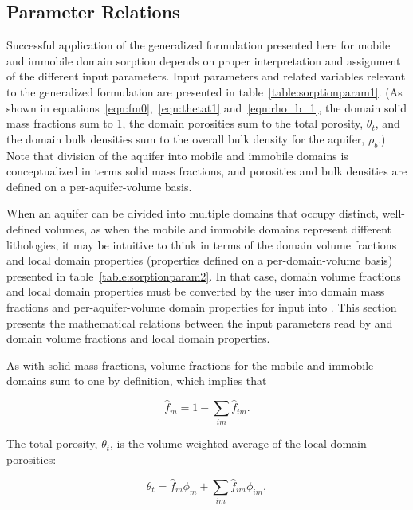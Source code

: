 \subsection{Parameter Relations} \label{sec:solidmassfrac3}

Successful application of the generalized formulation presented here for mobile and immobile domain sorption depends on proper interpretation and assignment of the different input parameters.  Input parameters and related variables relevant to the generalized formulation are presented in table~\ref{table:sorptionparam1}. (As shown in equations~\ref{eqn:fm0},~\ref{eqn:thetat1} and~\ref{eqn:rho_b_1}, the domain solid mass fractions sum to 1, the domain porosities sum to the total porosity, $\theta_t$, and the domain bulk densities sum to the overall bulk density for the aquifer, $\rho_b$.) Note that division of the aquifer into mobile and immobile domains is conceptualized in terms solid mass fractions, and porosities and bulk densities are defined on a per-aquifer-volume basis.  



When an aquifer can be divided into multiple domains that occupy distinct, well-defined volumes, as when the mobile and immobile domains represent different lithologies, it may be intuitive to think in terms of the domain volume fractions and local domain properties (properties defined on a per-domain-volume basis) presented in table~\ref{table:sorptionparam2}.  In that case, domain volume fractions and local domain properties must be converted by the user into domain mass fractions and per-aquifer-volume domain properties for input into \mf.  This section presents the mathematical relations between the input parameters read by \mf and domain volume fractions and local domain properties.



As with solid mass fractions, volume fractions for the mobile and immobile domains sum to one by definition, which implies that

\begin{equation}
\label{eqn:fm5}
\hat{f}_m = 1 -  \sum_{im}{\hat{f}_{im}}.
\end{equation}

\noindent The total porosity, $\theta_t$, is the volume-weighted average of the local domain porosities:

\begin{equation}
\label{eqn:thetat}
\theta_{t} =  \hat{f}_{m} \phi_{m} +  \sum_{im}{ \hat{f}_{im} \phi_{im}},
\end{equation}

